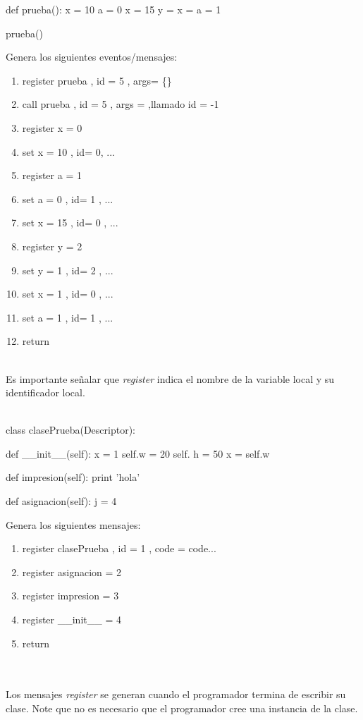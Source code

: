 \documentclass[10pt,a4paper]{article}
\begin{document}
\begin{minipage}{5.5cm}
\begin{boxedverbatim}
def prueba():
    x = 10
    a = 0
    x = 15
    y = x = a = 1

prueba()
\end{boxedverbatim}
\end{minipage}
\begin{minipage}{5.5cm}
Genera los siguientes eventos/mensajes:
\begin{enumerate}
\item register prueba , id = 5 , args= \{\}
\item call prueba , id = 5 , args = {} ,llamado id = -1
\item register x = 0
\item set x = 10 , id= 0, ...
\item register a = 1
\item set a = 0 , id= 1 , ...
\item set x = 15 , id= 0 , ...
\item register y = 2
\item set y = 1 , id= 2 , ...
\item set x = 1 , id= 0 , ...
\item set a = 1 , id= 1 , ...
\item return\\
\end{enumerate}
\end{minipage}
\\
Es importante señalar que \textit{register} indica el nombre de la variable local y su identificador local.\\
\\
\begin{minipage}{6cm}
\begin{boxedverbatim}
class clasePrueba(Descriptor):

    def __init__(self):
        x = 1
        self.w = 20
        self. h = 50
        x = self.w

    def impresion(self):
        print 'hola'

    def asignacion(self):
        j = 4
\end{boxedverbatim}
\end{minipage}
\begin{minipage}{5cm}
Genera los siguientes mensajes:
\begin{enumerate}
\item register clasePrueba , id = 1 , code = code...
\item register asignacion = 2
\item register impresion = 3
\item register \_\_init\_\_ = 4
\item return\\
\end{enumerate}
\end{minipage}\\
\\
Los mensajes \textit{register} se generan cuando el programador termina de escribir su clase.  Note que no es necesario que el programador cree una instancia de la clase.
\end{document}
